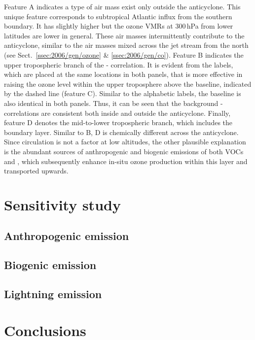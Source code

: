 Feature A indicates a type of air mass exist only outside the anticyclone. This unique feature corresponds to subtropical Atlantic
influx from the southern boundary. It has slightly higher  but the ozone VMRs at 300\,\unit{hPa} from lower latitudes are
lower in general. These air masses intermittently contribute to the anticyclone, similar to the air masses mixed across the jet stream
from the north (see Sect.~\ref{ssec:2006/gen/ozone} \& \ref{ssec:2006/gen/co}). Feature B indicates the upper tropospheric branch
of the - correlation. It is evident from the labels, which are placed at the same locations in both panels, that
 is more effective in raising the ozone level within the upper troposphere above the baseline, indicated by the dashed
line (feature C). Similar to the alphabetic labels, the baseline is also identical in both panels. Thus, it can be seen that the background
- correlations are consistent both inside and outside the anticyclone. Finally, feature D denotes the mid-to-lower
tropospheric branch, which includes the boundary layer. Similar to B, D is chemically different across the anticyclone. Since circulation
is not a factor at low altitudes, the other plausible explanation is the abundant sources of anthropogenic and biogenic emissions of both
VOCs and , which subsequently enhance in-situ ozone production within this layer and transported upwards.

\section{Sensitivity study}\label{sec:2006/sens}
\subsection{Anthropogenic emission}\label{ssec:2006/sens/anthrop}
\subsection{Biogenic emission}\label{ssec:2006/sens/bio}
\subsection{Lightning emission}\label{ssec:2006/sens/lnox}

\section{Conclusions}\label{sec:2006/conslusion}